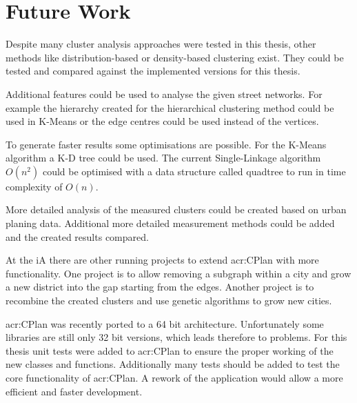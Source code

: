 \chapter{Future Work}
\label{sec:future_work}

Despite many cluster analysis approaches were tested in this thesis, other methods like distribution-based or density-based clustering exist. They could be tested and compared against the implemented versions for this thesis.

Additional features could be used to analyse the given street networks. For example the hierarchy created for the hierarchical clustering method could be used in K-Means or the edge centres could be used instead of the vertices.

To generate faster results some optimisations are possible. For the K-Means algorithm a K-D tree could be used. The current Single-Linkage algorithm $O(n^2)$ could be optimised with a data structure called quadtree to run in time complexity of $O(n)$.

More detailed analysis of the measured clusters could be created based on urban planing data. Additional more detailed measurement methods could be added and the created results compared.

At the \gls{iA} there are other running projects to extend \gls{acr:CPlan} with more functionality. One project is to allow removing a subgraph within a city and grow a new district into the gap starting from the edges. Another project is to recombine the created clusters and use genetic algorithms to grow new cities.

\acrshort{acr:CPlan} was recently ported to a 64 bit architecture. Unfortunately some libraries are still only 32 bit versions, which leads therefore to problems. For this thesis unit tests were added to \acrshort{acr:CPlan} to ensure the proper working of the new classes and functions. Additionally many tests should be added to test the core functionality of \acrshort{acr:CPlan}. A rework of the application would allow a more efficient and faster development.
